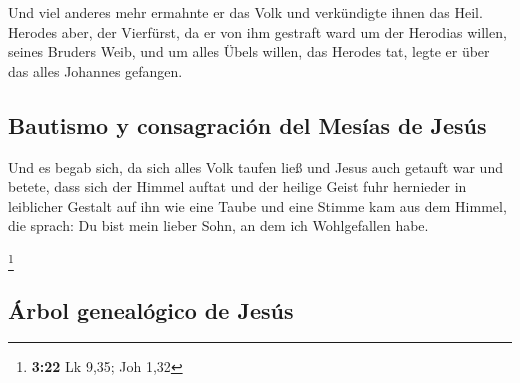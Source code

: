  Und viel anderes mehr ermahnte er das Volk und
verkündigte ihnen das Heil.  Herodes aber, der Vierfürst,
da er von ihm gestraft ward um der Herodias willen, seines Bruders Weib,
und um alles Übels willen, das Herodes tat,  legte er
über das alles Johannes gefangen.

\hypertarget{bautismo-y-consagraciuxf3n-del-mesuxedas-de-jesuxfas}{%
\subsection{Bautismo y consagración del Mesías de
Jesús}\label{bautismo-y-consagraciuxf3n-del-mesuxedas-de-jesuxfas}}

 Und es begab sich, da sich alles Volk taufen ließ und
Jesus auch getauft war und betete, dass sich der Himmel auftat
 und der heilige Geist fuhr hernieder in leiblicher
Gestalt auf ihn wie eine Taube und eine Stimme kam aus dem Himmel, die
sprach: Du bist mein lieber Sohn, an dem ich Wohlgefallen habe.

\footnote{\textbf{3:22} Lk 9,35; Joh 1,32}

\hypertarget{uxe1rbol-genealuxf3gico-de-jesuxfas}{%
\subsection{Árbol genealógico de
Jesús}\label{uxe1rbol-genealuxf3gico-de-jesuxfas}}

